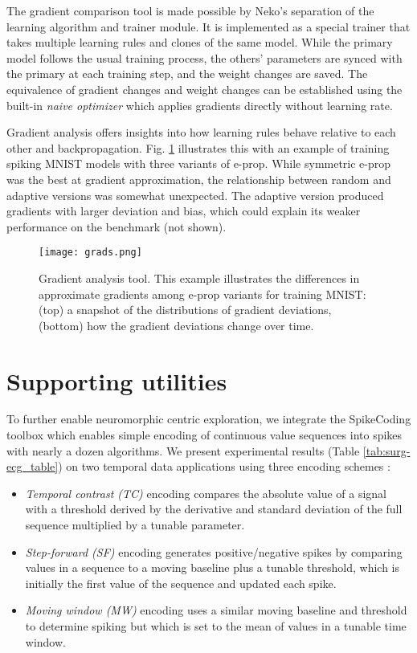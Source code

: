 \documentclass[sigconf,dvipsnames]{acmart}
\begin{document}
The gradient comparison tool is made possible by Neko's separation of the learning algorithm and trainer module. It is implemented as a special trainer that takes multiple learning rules and clones of the same model. While the primary model follows the usual training process, the others' parameters are synced with the primary at each training step, and the weight changes are saved. The equivalence of gradient changes and weight changes can be established using the built-in \emph{naive optimizer} which applies gradients directly without learning rate.

Gradient analysis offers insights into how learning rules behave relative to each other and backpropagation.
Fig. \ref{fig:grads} illustrates this with an example of training spiking MNIST models with three variants of e-prop.
While symmetric e-prop was the best at gradient approximation, the relationship between random and adaptive versions was somewhat unexpected.
The adaptive version produced gradients with larger deviation and bias, which could explain its weaker performance on the benchmark (not shown).


\begin{figure}
    \centering
    \texttt{[image: grads.png]}
    \caption{Gradient analysis tool.
      \textmd{This example illustrates the differences in approximate gradients among e-prop variants for training MNIST: (top) a snapshot of the distributions of gradient deviations, (bottom) how the gradient deviations change over time.}
    }
    \label{fig:grads}
\end{figure}


\section{Supporting utilities}
To further enable neuromorphic centric exploration, we integrate the SpikeCoding toolbox \cite{SpikeCoding2021} which enables simple encoding of continuous value sequences into spikes with nearly a dozen algorithms.
We present experimental results (Table \ref{tab:surg-ecg_table}) on two temporal data applications using three encoding schemes \cite{Petro2020}:
\begin{itemize}
\item \emph{Temporal contrast (TC)} encoding compares the absolute value of a signal with a threshold derived by the derivative and standard deviation of the full sequence multiplied by a tunable parameter.
\item \emph{Step-forward (SF)} encoding generates positive/negative spikes by comparing values in a sequence to a moving baseline plus a tunable threshold, which is initially the first value of the sequence and updated each spike.
\item \emph{Moving window (MW)} encoding uses a similar moving baseline and threshold to determine spiking but which is set to the mean of values in a tunable time window.
\end{itemize}
\end{document}
